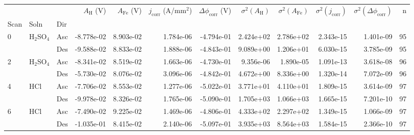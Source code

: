 \begin{tabular}{lllrrrrrrrrr}
\toprule
  &     &     &  $A_{\text{H}}$ (V) &  $A_{\text{Fe}}$ (V) &  $j_{\text{corr}}$ (A/mm$^2$) &  $\Delta \phi_{\text{corr}}$ (V) &  $\sigma^2(A_{\text{H}})$ &  $\sigma^2(A_{\text{Fe}})$ &  $\sigma^2(j_{\text{corr}})$ &  $\sigma^2(\Delta \phi_{\text{corr}})$ &   n \\
Scan & Soln & Dir &                     &                      &                               &                                  &                           &                            &                              &                                        &     \\
\midrule
0 & H$_2$SO$_4$ & Asc &          -8.778e-02 &            8.903e-02 &                     1.784e-06 &                       -4.794e-01 &                 2.424e+02 &                  2.786e+02 &                    2.343e-15 &                              1.401e-09 &  95 \\
  &     & Des &          -9.588e-02 &            8.833e-02 &                     1.888e-06 &                       -4.843e-01 &                 9.089e+00 &                  1.206e+01 &                    6.030e-15 &                              3.785e-09 &  95 \\
2 & H$_2$SO$_4$ & Asc &          -8.341e-02 &            8.519e-02 &                     1.663e-06 &                       -4.730e-01 &                 9.356e-06 &                  1.890e-05 &                    1.091e-13 &                              3.618e-08 &  96 \\
  &     & Des &          -5.730e-02 &            8.076e-02 &                     3.096e-06 &                       -4.842e-01 &                 4.672e+00 &                  8.336e+00 &                    1.320e-14 &                              7.072e-09 &  96 \\
4 & HCl & Asc &          -7.706e-02 &            8.553e-02 &                     1.277e-06 &                       -5.022e-01 &                 3.771e+01 &                  4.110e+01 &                    1.809e-15 &                              3.614e-09 &  97 \\
  &     & Des &          -9.978e-02 &            8.326e-02 &                     1.765e-06 &                       -5.090e-01 &                 1.705e+03 &                  1.066e+03 &                    1.665e-15 &                              7.201e-10 &  97 \\
6 & HCl & Asc &          -7.490e-02 &            9.225e-02 &                     1.469e-06 &                       -4.806e-01 &                 4.333e+02 &                  2.297e+02 &                    1.349e-15 &                              1.066e-09 &  97 \\
  &     & Des &          -1.035e-01 &            8.415e-02 &                     2.140e-06 &                       -5.097e-01 &                 3.935e+03 &                  8.564e+03 &                    1.584e-15 &                              2.366e-10 &  97 \\
\bottomrule
\end{tabular}
